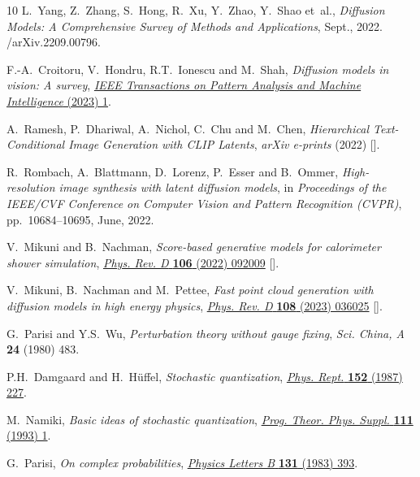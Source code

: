 \begin{thebibliography}{10}
L.~Yang, Z.~Zhang, S.~Hong, R.~Xu, Y.~Zhao, Y.~Shao et~al., \emph{Diffusion
  {{Models}}: {{A Comprehensive Survey}} of {{Methods}} and {{Applications}}},
  Sept., 2022.
/arXiv.2209.00796.

F.-A.~Croitoru, V.~Hondru, R.T.~Ionescu and M.~Shah, \emph{Diffusion models in
  vision: A survey},
  \href{https://doi.org/10.1109/TPAMI.2023.3261988}{\emph{IEEE Transactions on
  Pattern Analysis and Machine Intelligence} (2023) 1}.

A.~{Ramesh}, P.~{Dhariwal}, A.~{Nichol}, C.~{Chu} and M.~{Chen},
  \emph{{Hierarchical Text-Conditional Image Generation with CLIP Latents}},
  {\emph{arXiv e-prints} (2022) }
  [\href{https://arxiv.org/abs/2204.06125}{{}}].

R.~Rombach, A.~Blattmann, D.~Lorenz, P.~Esser and B.~Ommer,
  \emph{High-resolution image synthesis with latent diffusion models},  in
  \emph{Proceedings of the IEEE/CVF Conference on Computer Vision and Pattern
  Recognition (CVPR)}, pp.~10684--10695, June, 2022.

V.~Mikuni and B.~Nachman, \emph{{Score-based generative models for calorimeter
  shower simulation}},
  \href{https://doi.org/10.1103/PhysRevD.106.092009}{\emph{Phys. Rev. D}
  {\bfseries 106} (2022) 092009}
  [\href{https://arxiv.org/abs/2206.11898}{{}}].

V.~Mikuni, B.~Nachman and M.~Pettee, \emph{{Fast point cloud generation with
  diffusion models in high energy physics}},
  \href{https://doi.org/10.1103/PhysRevD.108.036025}{\emph{Phys. Rev. D}
  {\bfseries 108} (2023) 036025}
  [\href{https://arxiv.org/abs/2304.01266}{{}}].

G.~Parisi and Y.S.~Wu, \emph{{Perturbation theory without gauge fixing}},
  {\emph{Sci. China, A} {\bfseries 24} (1980) 483}.

P.H.~Damgaard and H.~H{\"u}ffel, \emph{Stochastic quantization},
  \href{https://doi.org/10.1016/0370-1573(87)90144-X}{\emph{Phys. Rept.}
  {\bfseries 152} (1987) 227}.

M.~Namiki, \emph{{Basic ideas of stochastic quantization}},
  \href{https://doi.org/10.1143/PTPS.111.1}{\emph{Prog. Theor. Phys. Suppl.}
  {\bfseries 111} (1993) 1}.

G.~Parisi, \emph{On complex probabilities},
  \href{https://doi.org/10.1016/0370-2693(83)90525-7}{\emph{Physics Letters B}
  {\bfseries 131} (1983) 393}.


\end{thebibliography}
